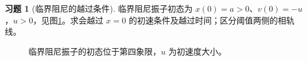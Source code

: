 \documentclass[11pt,openany,fontset=fandol]{ctexbook}
\theoremstyle{definition}\newtheorem{example}{例}[chapter]\newtheorem{exercise}{习题}[chapter]
\begin{document}
\par\medskip\noindent\begin{minipage}{\textwidth}
\begin{exercise}[临界阻尼的越过条件]\label{mp4:exercise:l4-h10}
临界阻尼振子初态为 $x(0)=a>0$、$v(0)=-u$，$u>0$，见图\ref{mp4:fig:l4-h10-q}。求会越过 $x=0$ 的初速条件及越过时间；区分阈值两侧的相轨线。
\end{exercise}

\begin{figure}[H]\centering
{}
\caption{临界阻尼振子的初态位于第四象限，$u$ 为初速度大小。}\label{mp4:fig:l4-h10-q}
\end{figure}
\end{minipage}\par\medskip
\end{document}
